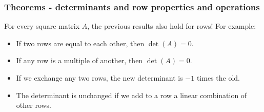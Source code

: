 \documentclass[usenames,dvipsnames,aspectratio=169,10pt]{beamer}
\numberwithin{equation}{section}
\begin{document}
\begin{frame}
\frametitle{Theorems - determinants and row properties and operations}
For every square matrix $A$, the previous results also hold for rows! For example:
\begin{itemize}
\item If two rows are equal to each other, then $\det(A)=0$.
\item If any row is a multiple of another, then $\det(A)=0$.
\item If we exchange any two rows, the new determinant is $-1$ times the old.
\item The determinant is unchanged if we add to a row a linear combination of other rows.
\end{itemize}
\end{frame}
\end{document}

